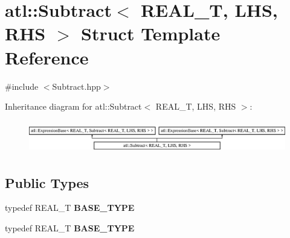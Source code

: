 \hypertarget{structatl_1_1_subtract}{\section{atl\+:\+:Subtract$<$ R\+E\+A\+L\+\_\+\+T, L\+H\+S, R\+H\+S $>$ Struct Template Reference}
\label{structatl_1_1_subtract}
}


{\ttfamily \#include $<$Subtract.\+hpp$>$}

Inheritance diagram for atl\+:\+:Subtract$<$ R\+E\+A\+L\+\_\+\+T, L\+H\+S, R\+H\+S $>$\+:\begin{figure}[H]
\begin{center}
\leavevmode
\includegraphics[height=1.428571cm]{structatl_1_1_subtract}
\end{center}
\end{figure}
\subsection*{Public Types}
\begin{DoxyCompactItemize}
\item 
\hypertarget{structatl_1_1_subtract_a55824989e3eac095ebab0f24e7bf49da}{typedef R\+E\+A\+L\+\_\+\+T {\bfseries B\+A\+S\+E\+\_\+\+T\+Y\+P\+E}}\label{structatl_1_1_subtract_a55824989e3eac095ebab0f24e7bf49da}

\item 
\hypertarget{structatl_1_1_subtract_a55824989e3eac095ebab0f24e7bf49da}{typedef R\+E\+A\+L\+\_\+\+T {\bfseries B\+A\+S\+E\+\_\+\+T\+Y\+P\+E}}\label{structatl_1_1_subtract_a55824989e3eac095ebab0f24e7bf49da}

\end{DoxyCompactItemize}
